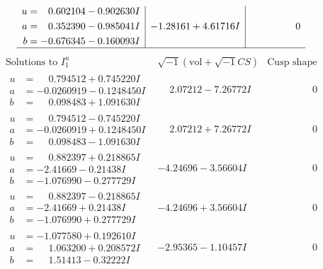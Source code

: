 \documentclass[1p]{elsarticle_modified}
\theoremstyle{definition}
\newcommand{\I}{\sqrt{-1}}
\begin{document}
$$\begin{array}{c|c|c}
\begin{aligned}
u &= \phantom{-}0.602104 - 0.902630 I \\
a &= \phantom{-}0.352390 - 0.985041 I \\
b &= -0.676345 - 0.160093 I\end{aligned}
 & -1.28161 + 4.61716 I & \phantom{-0.000000 } 0\\
 \hline 
 \end{array}$$\newpage$$\begin{array}{c|c|c}  
\text{Solutions to }I^u_{1}& \I (\text{vol} + \sqrt{-1}CS) & \text{Cusp shape}\\
 \hline 
\begin{aligned}
u &= \phantom{-}0.794512 + 0.745220 I \\
a &= -0.0260919 - 0.1248450 I \\
b &= \phantom{-}0.098483 + 1.091630 I\end{aligned}
 & \phantom{-}2.07212 - 7.26772 I & \phantom{-0.000000 } 0 \\ \hline\begin{aligned}
u &= \phantom{-}0.794512 - 0.745220 I \\
a &= -0.0260919 + 0.1248450 I \\
b &= \phantom{-}0.098483 - 1.091630 I\end{aligned}
 & \phantom{-}2.07212 + 7.26772 I & \phantom{-0.000000 } 0 \\ \hline\begin{aligned}
u &= \phantom{-}0.882397 + 0.218865 I \\
a &= -2.41669 - 0.21438 I \\
b &= -1.076990 - 0.277729 I\end{aligned}
 & -4.24696 - 3.56604 I & \phantom{-0.000000 } 0 \\ \hline\begin{aligned}
u &= \phantom{-}0.882397 - 0.218865 I \\
a &= -2.41669 + 0.21438 I \\
b &= -1.076990 + 0.277729 I\end{aligned}
 & -4.24696 + 3.56604 I & \phantom{-0.000000 } 0 \\ \hline\begin{aligned}
u &= -1.077580 + 0.192610 I \\
a &= \phantom{-}1.063200 + 0.208572 I \\
b &= \phantom{-}1.51413 - 0.32222 I\end{aligned}
 & -2.95365 - 1.10457 I & \phantom{-0.000000 } 0 \\ \hline\begin{aligned}

\end{aligned}
\end{array}$$
\end{document}
